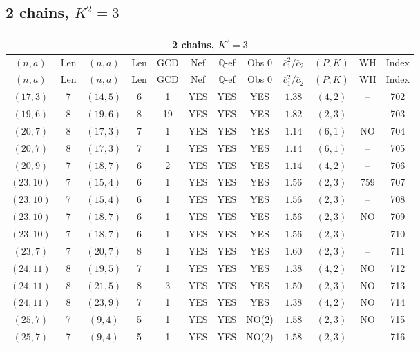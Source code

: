 \subsection{2 chains, $K^2 = 3$}
\begin{longtable}{|c|c|c|c|c|c|c|c|c|c|c|c|}
\hline
\multicolumn{12}{|c|}{2 chains, $K^2 = 3$}\\
\hline
$(n,a)$ & Len & $(n,a)$ & Len & GCD & Nef & $\mathbb Q$-ef & Obs 0 & $\overline c_1^2 / \overline c_2$ & $(P,K)$ & WH & Index\\
\hline
\endfirsthead

\hline
$(n,a)$ & Len & $(n,a)$ & Len & GCD & Nef & $\mathbb Q$-ef & Obs 0 & $\overline c_1^2 / \overline c_2$ & $(P,K)$ & WH & Index\\
\hline
\endhead
\hline
\endfoot

$(17,3)$ & 7 & $(14,5)$ & 6 & 1 & YES & YES & YES & $1.38$ & $(4,2)$ & -- & 702\\
$(19,6)$ & 8 & $(19,6)$ & 8 & 19 & YES & YES & YES & $1.82$ & $(2,3)$ & -- & 703\\
$(20,7)$ & 8 & $(17,3)$ & 7 & 1 & YES & YES & YES & $1.14$ & $(6,1)$ & NO & 704\\
$(20,7)$ & 8 & $(17,3)$ & 7 & 1 & YES & YES & YES & $1.14$ & $(6,1)$ & -- & 705\\
$(20,9)$ & 7 & $(18,7)$ & 6 & 2 & YES & YES & YES & $1.14$ & $(4,2)$ & -- & 706\\
$(23,10)$ & 7 & $(15,4)$ & 6 & 1 & YES & YES & YES & $1.56$ & $(2,3)$ & 759 & 707\\
$(23,10)$ & 7 & $(15,4)$ & 6 & 1 & YES & YES & YES & $1.56$ & $(2,3)$ & -- & 708\\
$(23,10)$ & 7 & $(18,7)$ & 6 & 1 & YES & YES & YES & $1.56$ & $(2,3)$ & NO & 709\\
$(23,10)$ & 7 & $(18,7)$ & 6 & 1 & YES & YES & YES & $1.56$ & $(2,3)$ & -- & 710\\
$(23,7)$ & 7 & $(20,7)$ & 8 & 1 & YES & YES & YES & $1.60$ & $(2,3)$ & -- & 711\\
$(24,11)$ & 8 & $(19,5)$ & 7 & 1 & YES & YES & YES & $1.38$ & $(4,2)$ & NO & 712\\
$(24,11)$ & 8 & $(21,5)$ & 8 & 3 & YES & YES & YES & $1.50$ & $(2,3)$ & NO & 713\\
$(24,11)$ & 8 & $(23,9)$ & 7 & 1 & YES & YES & YES & $1.38$ & $(4,2)$ & NO & 714\\
$(25,7)$ & 7 & $(9,4)$ & 5 & 1 & YES & YES & NO(2) & $1.58$ & $(2,3)$ & NO & 715\\
$(25,7)$ & 7 & $(9,4)$ & 5 & 1 & YES & YES & NO(2) & $1.58$ & $(2,3)$ & -- & 716\\

\end{longtable}
